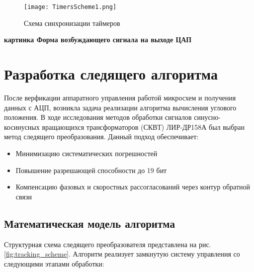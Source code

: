 \begin{figure}[!h]
  \centering
  \texttt{[image: TimersScheme1.png]} 
  \caption{Схема синхронизации таймеров}
  \label{Timers}
\end{figure}

\textbf{картинка Форма возбуждающего сигнала на выходе ЦАП}

\newpage
\section{Разработка следящего алгоритма}
После верфикации аппаратного управления работой микросхем и получения данных с АЦП, возникла задача реализации алгоритма вычисления углового положения. 
В ходе исследования методов обработки сигналов синусно-косинусных вращающихся трансформаторов (СКВТ) ЛИР-ДР158А был выбран метод следящего преобразования. 
Данный подход обеспечивает:
\begin{itemize}
    \item Минимизацию систематических погрешностей
    \item Повышение разрешающей способности до 19 бит
    \item Компенсацию фазовых и скоростных рассогласований через контур обратной связи
\end{itemize}

\subsection{Математическая модель алгоритма}
Структурная схема следящего преобразователя представлена на рис. \ref{fig:tracking_scheme}. 
Алгоритм реализует замкнутую систему управления со следующими этапами обработки:

